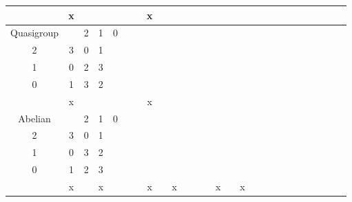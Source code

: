 \begin{longtable}{| c | c | c | c | c | c | c | c | c | c | c | c | c | c | c | c | c | c | c | c | c | c | c | c | c | c |}
 &  x &   &   &   &   &   & x &   &   &   &   &   &   &   &   &   &   &   &   &   &   &   &   &   \\ \hline
    Quasigroup &
\( \begin{matrix}
    3 & 2 & 1 & 0 \\
    2 & 3 & 0 & 1 \\
    1 & 0 & 2 & 3 \\
    0 & 1 & 3 & 2 \\
\end{matrix} \)
 &  x &   &   &   &   &   & x &   &   &   &   &   &   &   &   &   &   &   &   &   &   &   &   &   \\ \hline
    Abelian &
\( \begin{matrix}
    3 & 2 & 1 & 0 \\
    2 & 3 & 0 & 1 \\
    1 & 0 & 3 & 2 \\
    0 & 1 & 2 & 3 \\
\end{matrix} \)
 &  x &   & x &   &   &   & x &   & x &   &   &   & x &   & x &   &   &   &   &   &   &   &   &   \\ \hline
\end{longtable}
